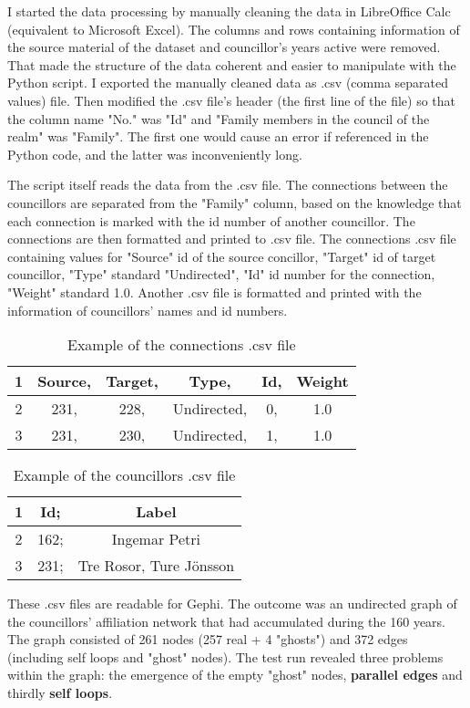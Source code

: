 I started the data processing by manually cleaning the data in LibreOffice Calc (equivalent to Microsoft Excel). The columns and rows containing information of the source material of the dataset and councillor's years active were removed. That made the structure of the data coherent and easier to manipulate with the Python script. I exported the manually cleaned data as .csv (comma separated values) file. Then modified the .csv file's header (the first line of the file) so that the column name "No." was "Id" and "Family members in the council of the realm" was "Family". The first one would cause an error if referenced in the Python code, and the latter was inconveniently long.

The script itself reads the data from the .csv file. The connections between the councillors are separated from the "Family" column, based on the knowledge that each connection is marked with the id number of another councillor. The connections are then formatted and printed to .csv file. The connections .csv file containing values for "Source" id of the source concillor, "Target" id of target councillor, "Type" standard "Undirected", "Id" id number for the connection, "Weight" standard 1.0. Another .csv file is formatted and printed with the information of councillors' names and id numbers.

\begin{table}
	\caption{Example of the connections .csv file}
	\centering
	\begin{tabular}{cccccc}
		\hline
		1 &Source, &Target, &Type, &Id, &Weight \\
		\hline
		2 &231, &228, &Undirected, &0, &1.0 \\
		\hline
		3 &231, &230, &Undirected, &1, &1.0 \\
		\hline
	\end{tabular}
\end{table}
\begin{table}
	\caption{Example of the councillors .csv file}
	\centering
	\begin{tabular}{ccc}	
		\hline
		1 &Id; &Label \\
		\hline
		2 &162; &Ingemar Petri \\
		\hline
		3 &231; &Tre Rosor, Ture Jönsson \\
		\hline
	\end{tabular}
\end{table}

These .csv files are readable for Gephi. The outcome was an undirected graph of the councillors' affiliation network that had accumulated during the 160 years. The graph consisted of 261 nodes (257 real + 4 "ghosts") and 372 edges (including self loops and "ghost" nodes). The test run revealed three problems within the graph: the emergence of the empty "ghost" nodes, \textbf{parallel edges} and thirdly \textbf{self loops}. 

